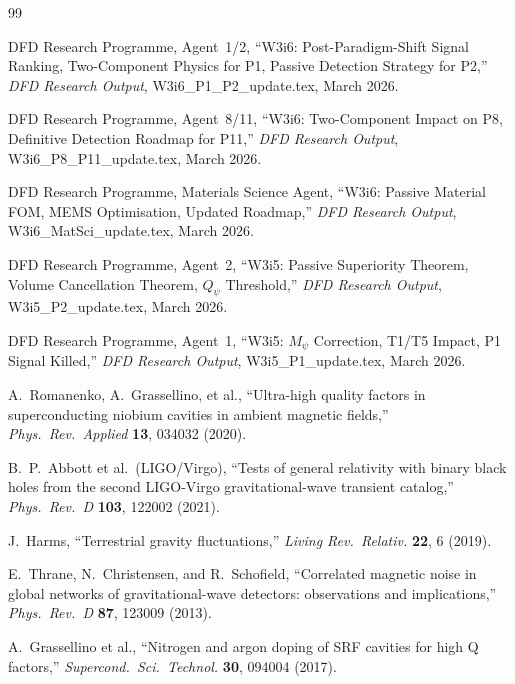\documentclass[11pt]{article}
\theoremstyle{definition}
\theoremstyle{remark}
\begin{document}
\begin{thebibliography}{99}

DFD Research Programme, Agent~1/2,
``W3i6: Post-Paradigm-Shift Signal Ranking, Two-Component Physics for P1,
Passive Detection Strategy for P2,''
\textit{DFD Research Output}, W3i6\_P1\_P2\_update.tex, March 2026.

DFD Research Programme, Agent~8/11,
``W3i6: Two-Component Impact on P8, Definitive Detection Roadmap for P11,''
\textit{DFD Research Output}, W3i6\_P8\_P11\_update.tex, March 2026.

DFD Research Programme, Materials Science Agent,
``W3i6: Passive Material FOM, MEMS Optimisation, Updated Roadmap,''
\textit{DFD Research Output}, W3i6\_MatSci\_update.tex, March 2026.

DFD Research Programme, Agent~2,
``W3i5: Passive Superiority Theorem, Volume Cancellation Theorem,
$Q_\psi$ Threshold,''
\textit{DFD Research Output}, W3i5\_P2\_update.tex, March 2026.

DFD Research Programme, Agent~1,
``W3i5: $M_\psi$ Correction, T1/T5 Impact, P1 Signal Killed,''
\textit{DFD Research Output}, W3i5\_P1\_update.tex, March 2026.

A.~Romanenko, A.~Grassellino, et al.,
``Ultra-high quality factors in superconducting niobium cavities in
ambient magnetic fields,''
\textit{Phys.\ Rev.\ Applied} \textbf{13}, 034032 (2020).

B.~P.~Abbott et al.\ (LIGO/Virgo),
``Tests of general relativity with binary black holes from the second
LIGO-Virgo gravitational-wave transient catalog,''
\textit{Phys.\ Rev.\ D} \textbf{103}, 122002 (2021).

J.~Harms,
``Terrestrial gravity fluctuations,''
\textit{Living Rev.\ Relativ.} \textbf{22}, 6 (2019).

E.~Thrane, N.~Christensen, and R.~Schofield,
``Correlated magnetic noise in global networks of gravitational-wave
detectors: observations and implications,''
\textit{Phys.\ Rev.\ D} \textbf{87}, 123009 (2013).

A.~Grassellino et al.,
``Nitrogen and argon doping of SRF cavities for high Q factors,''
\textit{Supercond.\ Sci.\ Technol.} \textbf{30}, 094004 (2017).

\end{thebibliography}
\end{document}
